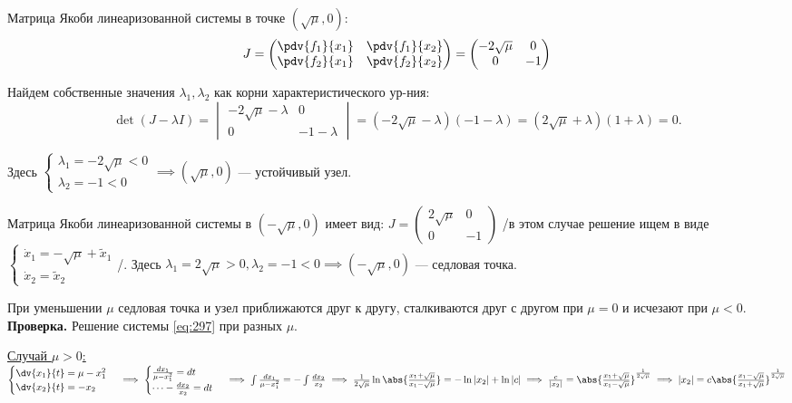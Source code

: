 Матрица Якоби линеаризованной системы в точке $(\sqrt{\mu}, 0)$:
$$J = \begin{pmatrix} \pdv{f_1}{x_1} & \pdv{f_1}{x_2} \\ \pdv{f_2}{x_1} & \pdv{f_2}{x_2} \end{pmatrix} = \begin{pmatrix} -2\sqrt{\mu} & 0 \\ 0 & -1 \end{pmatrix}$$

Найдем собственные значения $\lambda_1, \lambda_2$ как корни характеристического ур-ния:
$$\det(J - \lambda I) = \begin{vmatrix} -2\sqrt{\mu} - \lambda & 0 \\ 0 & -1-\lambda \end{vmatrix} = (-2\sqrt{\mu}-\lambda)(-1-\lambda) = (2\sqrt{\mu}+\lambda)(1+\lambda) = 0.$$

Здесь $\begin{cases} \lambda_1 = -2\sqrt{\mu} < 0 \\ \lambda_2 = -1 < 0 \end{cases} \implies (\sqrt{\mu}, 0)$ — устойчивый узел.

Матрица Якоби линеаризованной системы в $(- \sqrt{\mu}, 0)$ имеет вид: $J = \begin{pmatrix} 2\sqrt{\mu} & 0 \\ 0 & -1 \end{pmatrix}$ /в этом случае решение ищем в виде $\begin{cases} \dot{x}_1 = -\sqrt{\mu} + \tilde{x}_1 \\ \dot{x}_2 = \tilde{x}_2 \end{cases}$/.
Здесь $\lambda_1 = 2\sqrt{\mu} > 0, \lambda_2 = -1 < 0 \implies (-\sqrt{\mu}, 0)$ — седловая точка.

При уменьшении $\mu$ седловая точка и узел приближаются друг к другу, сталкиваются друг с другом при $\mu=0$ и исчезают при $\mu<0$. \\
\textbf{Проверка.} Решение системы \eqref{eq:297} при разных $\mu$.

\underline{Случай $\mu > 0$:} $\begin{cases} \dv{x_1}{t} = \mu - x_1^2 \\ \dv{x_2}{t} = -x_2 \end{cases} \implies \begin{cases} \frac{dx_1}{\mu - x_1^2} = dt \\ \dots - \frac{dx_2}{x_2} = dt \end{cases} \implies \int \frac{dx_1}{\mu - x_1^2} = -\int \frac{dx_2}{x_2} \implies \frac{1}{2\sqrt{\mu}} \ln\abs{\frac{x_1+\sqrt{\mu}}{x_1-\sqrt{\mu}}} = -\ln|x_2| + \ln|c| \implies \frac{c}{|x_2|} = \abs{\frac{x_1+\sqrt{\mu}}{x_1-\sqrt{\mu}}}^{\frac{1}{2\sqrt{\mu}}} \implies |x_2| = c \abs{\frac{x_1-\sqrt{\mu}}{x_1+\sqrt{\mu}}}^{\frac{1}{2\sqrt{\mu}}}$

